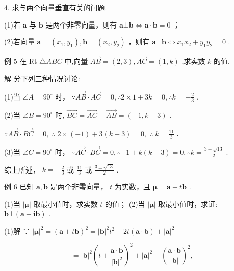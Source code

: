 \documentclass[10pt]{article}
\begin{document}
4. 求与两个向量垂直有关的问题.

(1)若 \(\mathbf{a}\) 与 \(\mathbf{b}\) 是两个非零向量，则有 \(\mathbf{a} \bot  \mathbf{b} \Leftrightarrow  \mathbf{a} \cdot  \mathbf{b} = 0\) ；

(2)若向量 \(\mathbf{a} = \left( {{x}_{1},{y}_{1}}\right) ,\mathbf{b} = \left( {{x}_{2},{y}_{2}}\right)\) ，则有 \(\mathbf{a} \bot  \mathbf{b} \Leftrightarrow  {x}_{1}{x}_{2} + {y}_{1}{y}_{2} = 0\) .

例 5 在 Rt \(\bigtriangleup {ABC}\) 中,向量 \(\overrightarrow{AB} = \left( {2,3}\right) ,\overrightarrow{AC} = \left( {1,k}\right)\) ,求实数 \(k\) 的值.

解 分下列三种情况讨论:

(1)当 \(\angle A = {90}^{ \circ  }\) 时， \(\because \overrightarrow{AB} \cdot  \overrightarrow{AC} = 0,\therefore 2 \times  1 + {3k} = 0,\therefore k =  - \frac{2}{3}\) .

(2)当 \(\angle B = {90}^{ \circ  }\) 时, \(\overrightarrow{BC} = \overrightarrow{AC} - \overrightarrow{AB} = \left( {-1,k - 3}\right)\) .

\(\because \overrightarrow{AB} \cdot  \overrightarrow{BC} = 0,\;\therefore \;2 \times  \left( {-1}\right)  + 3\left( {k - 3}\right)  = 0,\;\therefore \;k = \frac{11}{3}\) .

(3)当 \(\angle C = {90}^{ \circ  }\) 时， \(\because \overrightarrow{AC} \cdot  \overrightarrow{BC} = 0,\therefore  - 1 + k\left( {k - 3}\right)  = 0,\therefore k = \frac{3 \pm  \sqrt{13}}{2}\) .

综上所述， \(k =  - \frac{2}{3}\) 或 \(\frac{11}{3}\) 或 \(\frac{3 \pm  \sqrt{13}}{2}\) .

例 6 已知 \(\mathbf{a},\mathbf{b}\) 是两个非零向量， \(t\) 为实数，且 \(\mathbf{\mu } = \mathbf{a} + t\mathbf{b}\) .

(1)当 \(\left| \mathbf{\mu }\right|\) 取最小值时，求实数 \(t\) 的值； (2)当 \(\left| \mathbf{\mu }\right|\) 取最小值时，求证: \(\mathbf{b}\bot \left( {\mathbf{a} + \mathbf{i}\mathbf{b}}\right)\) .

(1)解 ∵ \({\left| \mathbf{\mu }\right| }^{2} = {\left( \mathbf{a} + t\mathbf{b}\right) }^{2} = {\left| \mathbf{b}\right| }^{2}{t}^{2} + {2t}\left( {\mathbf{a} \cdot  \mathbf{b}}\right)  + {\left| \mathbf{a}\right| }^{2}\)

\[
= {\left| \mathbf{b}\right| }^{2}{\left( t + \frac{\mathbf{a} \cdot  \mathbf{b}}{{\left| \mathbf{b}\right| }^{2}}\right) }^{2} + {\left| \mathbf{a}\right| }^{2} - {\left( \frac{\mathbf{a} \cdot  \mathbf{b}}{\left| \mathbf{b}\right| }\right) }^{2},
\]
\end{document}
